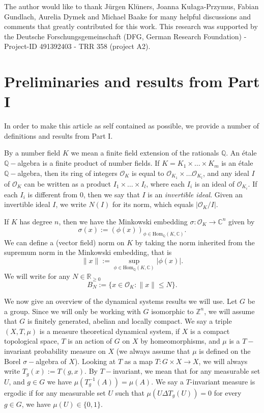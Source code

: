 \documentclass[a4paper,11pt,reqno]{amsart}
\theoremstyle{plain}
\theoremstyle{remark}
\newcommand{\q}{\mathbb{Q}}
\newcommand{\z}{\mathbb{Z}}
\newcommand{\co}{\mathcal{O}}
\begin{document}
The author would like to thank Jürgen Klüners, Joanna Kułaga-Przymus, Fabian Gundlach, Aurelia Dymek and Michael Baake for many helpful discussions and comments that greatly contributed for this work. This research was supported by the Deutsche Forschungsgemeinschaft (DFG, German Research Foundation) - Project-ID 491392403 - TRR 358 (project A2).
	
	
	
	
	
	
	\section{Preliminaries and results from Part I}
	
	
	In order to make this article as self contained as possible, we provide a number of definitions and results from Part I.
	
	By a number field $K$ we mean a finite field extension of the rationals $\q$. An étale $\q-$algebra is a finite product of number fields. If $K = K_1\times \dots \times K_m$ is an étale $\q-$algebra, then its ring of integers $\co_K$ is equal to  $\co_{K_1} \times \dots \co_{K_l}$, and any ideal $I$ of $\co_K$ can be written as a product $I_1 \times \dots \times I_l$, where each $I_i$ is an ideal of $\co_{K_i}$. If each $I_i$ is different from $0$, then we say that $I$ is an \textit{invertible ideal}. Given an invertible ideal $I$, we write $N(I)$ for its norm, which equals $|\co_K/I|$.
	
		If $K$ has degree $n$, then we have the Minkowski embedding $\sigma: \co_K \rightarrow \mathbb{C}^n$ given by $$\sigma(x):= (\phi(x))_{\phi \in \text{Hom}_\q(K, \mathbb{C})}.$$
	We can define a (vector field) norm on $K$ by taking the norm inherited from the supremum norm in the Minkowski embedding, that is
	\begin{equation}
		\label{eq: minkowsky norm}
		\|x\| := \sup_{\phi \in \text{Hom}_\q(K,\mathbb{C})}|\phi(x)|.
	\end{equation} 
	We will write for any $N \in \mathbb{R}_{\geq 0}$
	\begin{equation}
		\label{eq: definition of BN}
		B_N := \{x \in \co_K: \|x\| \leq N\}.
	\end{equation} 

  We now give an overview of the dynamical systems results we will use. Let $G$ be a group. Since we will only be working with $G$ isomorphic to $\z^n$, we will assume that $G$ is finitely generated, abelian and locally compact. We say a triple $(X,T,\mu)$ is a measure theoretical dynamical system, if $X$ is a compact topological space, $T$ is an action of $G$ on $X$ by homeomorphisms, and $\mu$ is a $T-$invariant probability measure on $X$ (we always assume that $\mu$ is defined on the Borel $\sigma-$algebra of $X$). Looking at $T$ as a map $T:G \times X \rightarrow X$, we will always write  $T_g(x) := T(g,x)$. By $T-$invariant, we mean that for any measurable set $U$, and $g\in G$ we have $\mu(T_g^{-1}(A)) = \mu(A)$. We say a $T$-invariant measure is ergodic if for any measurable set $U$ such that $\mu(U \Delta T_g(U)) = 0$ for every $g \in G$, we have $\mu(U) \in \{0,1\}$. 
\end{document}

